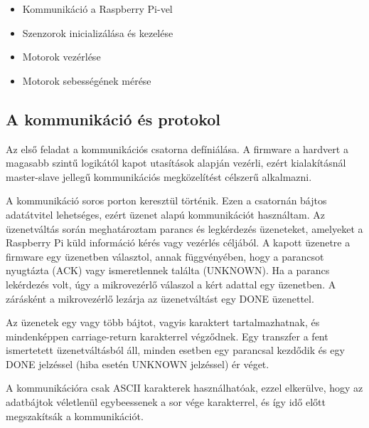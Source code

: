 \begin{itemize}
\item{Kommunikáció a Raspberry Pi-vel}
\item{Szenzorok inicializálása és kezelése}
\item{Motorok vezérlése}
\item{Motorok sebességének mérése}
\end{itemize}

\subsection{A kommunikáció és protokol}

Az első feladat a kommunikációs csatorna defíniálása. A firmware a hardvert a
magasabb szintű logikától kapot utasítások alapján vezérli, ezért kialakításnál
master-slave jellegű kommunikációs megközelítést célszerű alkalmazni.

A kommunikáció soros porton keresztül történik. Ezen a csatornán bájtos
adatátvitel lehetséges, ezért üzenet alapú kommunikációt használtam. Az
üzenetváltás során meghatároztam parancs és legkérdezés üzeneteket, amelyeket a
Raspberry Pi küld információ kérés vagy vezérlés céljából. A kapott üzenetre a
firmware egy üzenetben választol, annak függvényében, hogy a parancsot nyugtázta
(ACK) vagy ismeretlennek találta (UNKNOWN). Ha a parancs lekérdezés volt, úgy a
mikrovezérlő válaszol a kért adattal egy üzenetben. A zárásként a mikrovezérlő
lezárja az üzenetváltást egy DONE üzenettel.

Az üzenetek egy vagy több bájtot, vagyis karaktert tartalmazhatnak, és
mindenképpen carriage-return karakterrel végződnek. Egy transzfer a fent
ismertetett üzenetváltásból áll, minden esetben egy parancsal kezdődik és egy
DONE jelzéssel (hiba esetén UNKNOWN jelzéssel) ér véget.

A kommunikációra csak ASCII karakterek használhatóak, ezzel elkerülve, hogy az
adatbájtok véletlenül egybeessenek a sor vége karakterrel, és így idő előtt
megszakítsák a kommunikációt.

